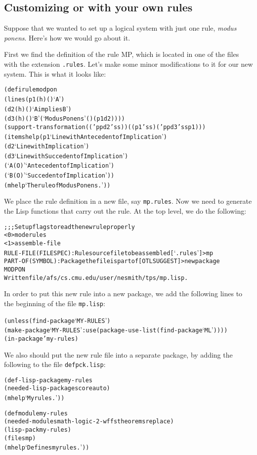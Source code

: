 \subsection{Customizing {\ETPS} or {\TPS} with your own rules}

Suppose that we wanted to set up a logical system with just one rule,
{\it modus ponens}.  Here's how we would go about it.

First we find the definition of the rule MP, which is located in one
of the files with the extension {\tt .rules}.  Let's make some minor
modifications to it for our new system. This is what it looks like:
\begin{alltt}
(defirule modpon
  (lines (p1 (h) () `A')
	 (d2 (h) () `A implies B')
	 (d3 (h) () `B' (`Modus Ponens' () (p1 d2))))
  (support-transformation (('pp d2 'ss)) ((p1 'ss) ('pp d3 'ss p1)))
  (itemshelp (p1 `Line with Antecedent of Implication')
	     (d2 `Line with Implication')
	     (d3 `Line with Succedent of Implication')
	     (`A(O)' `Antecedent of Implication')
	     (`B(O)' `Succedent of Implication'))
  (mhelp `The rule of Modus Ponens.'))
\end{alltt}

We place the rule definition in a new file, say {\tt mp.rules}.  Now we
need to generate the Lisp functions that carry out the rule.  At the
{\ETPS} top level, we do the following:
\begin{alltt}
;;; Set up flags to read the new rule properly
<0> mode rules
<1>assemble-file
RULE-FILE (FILESPEC): Rule source file to be assembled [`.rules']>mp
PART-OF (SYMBOL): Package the file is part of [OTLSUGGEST]>newpackage
MODPON
Written file /afs/cs.cmu.edu/user/nesmith/tps/mp.lisp.
\end{alltt}

In order to put this new rule into a new {\lisp} package, we add the following
lines to the beginning of the file {\tt mp.lisp}:
\begin{alltt}
(unless (find-package `MY-RULES')
  (make-package `MY-RULES' :use (package-use-list (find-package `ML'))))
(in-package 'my-rules)
\end{alltt}

We also should put the new rule file into a separate {\TPS} package, by
adding the following to the file {\tt defpck.lisp}:
\begin{alltt}
(def-lisp-package my-rules
  (needed-lisp-packages core auto)
  (mhelp `My rules.'))

(defmodule my-rules
  (needed-modules math-logic-2-wffs theorems replace)
  (lisp-pack my-rules)
  (files mp)
  (mhelp `Defines my rules.'))
\end{alltt}

